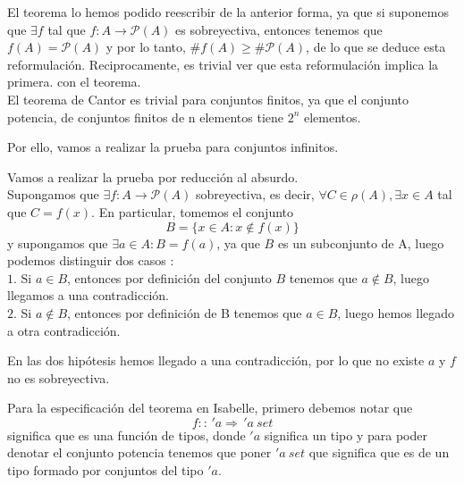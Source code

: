 \begin{isabellebody}
\begin{isamarkuptext}
El teorema lo hemos podido reescribir de la anterior forma, ya que si
 suponemos que $\exists f$ tal que $f: A \longrightarrow \mathcal{P}(A)$
es sobreyectiva, entonces tenemos que $f(A) = \mathcal{P}(A)$ y por lo
 tanto, $\# f(A) \geq \# \mathcal{P}(A)$, de lo que se deduce esta
 reformulación. Reciprocamente, es trivial ver que esta reformulación
 implica la primera.
 con el teorema. \\
El teorema de Cantor es trivial para conjuntos finitos, ya que el
 conjunto potencia, de conjuntos finitos de n elementos tiene
 $2^n$ elementos.

Por ello,  vamos a realizar la prueba para conjuntos infinitos. 


\begin{demostracion}
 
Vamos a realizar la prueba por reducción al absurdo.\\
Supongamos que $\exists f : A \longrightarrow \mathcal{P}(A)$ sobreyectiva, es
 decir, $\forall C \in \rho(A) ,  \exists x \in A$ tal que $C = f(x)$.
En particular, tomemos el conjunto $$B = \{ x \in A : x \notin f(x) \}$$
 y  supongamos que $\exists a \in A : B = f(a)$, ya que $B$ es un
 subconjunto de A, luego podemos distinguir dos casos $:$ \\
$1.$ Si $a \in B$, entonces por definición del conjunto $B$ tenemos que
$a \notin B$, luego llegamos a una contradicción. \\
$2.$ Si $a \notin B$, entonces por definición de B tenemos que $a \in 
B$, luego hemos llegado a otra contradicción. 

En las dos hipótesis hemos llegado a una contradicción,
por lo que no existe $a$ y $f$ no es sobreyectiva.
\end{demostracion}


Para la especificación del teorema en Isabelle, primero debemos notar
 que $$f :: \, 'a \Rightarrow \,'a \: set$$
 significa que es una función 
de tipos, donde $'a$ significa un tipo y para poder denotar
el conjunto potencia tenemos que poner $'a \ set$ que significa que es
 de un tipo formado por conjuntos del tipo $'a$.





\end{isamarkuptext}
\end{isabellebody}
